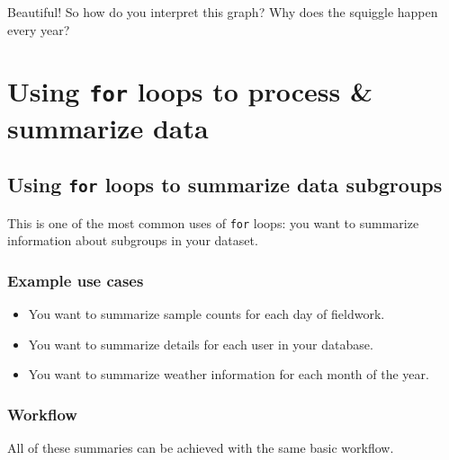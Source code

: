 \documentclass[
]{book}
\begin{document}
Beautiful! So how do you interpret this graph? Why does the squiggle happen every year?

\hypertarget{using-for-loops-to-process-summarize-data}{%
\section*{\texorpdfstring{Using \texttt{for} loops to process \& summarize data}{Using for loops to process \& summarize data}}\label{using-for-loops-to-process-summarize-data}}

\hypertarget{using-for-loops-to-summarize-data-subgroups}{%
\subsection*{\texorpdfstring{Using \texttt{for} loops to summarize data subgroups}{Using for loops to summarize data subgroups}}\label{using-for-loops-to-summarize-data-subgroups}}

This is one of the most common uses of \texttt{for} loops: you want to summarize information about subgroups in your dataset.

\hypertarget{example-use-cases}{%
\subsubsection*{Example use cases}\label{example-use-cases}}

\begin{itemize}
\item
  You want to summarize sample counts for each day of fieldwork.
\item
  You want to summarize details for each user in your database.
\item
  You want to summarize weather information for each month of the year.
\end{itemize}

\hypertarget{workflow}{%
\subsubsection*{Workflow}\label{workflow}}

All of these summaries can be achieved with the same basic workflow.
\end{document}
